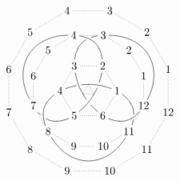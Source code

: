 \documentclass{article}
\begin{document}
\renewcommand{\labelstyle}{\scriptstyle}
\renewcommand{\objectstyle}{\scriptstyle}
\[\xygraph{!{0;/r2mm/:}
  !P3"t"{~>{.}}
  !P6"h"{~:{(4.5,0):}~>{.}~*{\xypolynode}}
  !P12"d"{~:{(9,0):}~>{.}~*{\xypolynode}}
  !P12"D"{~:{(13.,0):}~>{.}~*{\xypolynode}}
  !{\xoverv~{"h2"}{"h1"}{"t1"}{"t3"}@(.62)}
  !{\xoverv~{"h4"}{"h3"}{"t2"}{"t1"}@(.62)}
  !{\xoverv~{"h6"}{"h5"}{"t3"}{"t2"}@(.62)}
  !{\vover~{"d4"}{"d3"}{"h3"}{"h2"}}
              ,"d4"-@`{"D5","D6"}"d7",
  !{\vover~{"d8"}{"d7"}{"h5"}{"h4"}}
              ,"d8"-@`{"D9","D10"}"d11",
  !{\vover~{"d12"}{"d11"}{"h1"}{"h6"}}
              ,"d12"-@`{"D1","D2"}"d3"
}\]
\end{document}
